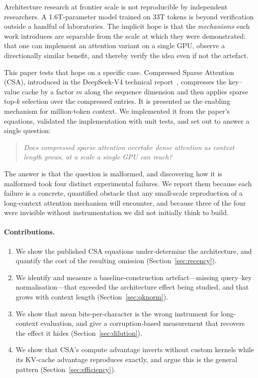 \documentclass[11pt]{article}
\begin{document}
Architecture research at frontier scale is not reproducible by independent
researchers. A 1.6T-parameter model trained on 33T tokens is beyond
verification outside a handful of laboratories. The implicit hope is that the
\emph{mechanisms} such work introduces are separable from the scale at which
they were demonstrated: that one can implement an attention variant on a single
GPU, observe a directionally similar benefit, and thereby verify the idea even
if not the artefact.

This paper tests that hope on a specific case. Compressed Sparse Attention
(CSA), introduced in the DeepSeek-V4 technical report~\cite{deepseekv4},
compresses the key--value cache by a factor $m$ along the sequence dimension
and then applies sparse top-$k$ selection over the compressed entries. It is
presented as the enabling mechanism for million-token context. We implemented
it from the paper's equations, validated the implementation with unit tests,
and set out to answer a single question:

\begin{quote}
\emph{Does compressed sparse attention overtake dense attention as context
length grows, at a scale a single GPU can reach?}
\end{quote}

The answer is that the question is malformed, and discovering how it is
malformed took four distinct experimental failures. We report them because each
failure is a concrete, quantified obstacle that any small-scale reproduction of
a long-context attention mechanism will encounter, and because three of the
four were invisible without instrumentation we did not initially think to
build.

\paragraph{Contributions.}
\begin{enumerate}
  \item We show the published CSA equations under-determine the architecture,
        and quantify the cost of the resulting omission
        (Section~\ref{sec:recency}).
  \item We identify and measure a baseline-construction artefact---missing
        query--key normalisation---that exceeded the architecture effect being
        studied, and that grows with context length
        (Section~\ref{sec:qknorm}).
  \item We show that mean bits-per-character is the wrong instrument for
        long-context evaluation, and give a corruption-based measurement that
        recovers the effect it hides (Section~\ref{sec:dilution}).
  \item We show that CSA's compute advantage inverts without custom kernels
        while its KV-cache advantage reproduces exactly, and argue this is the
        general pattern (Section~\ref{sec:efficiency}).
\end{enumerate}
\end{document}
